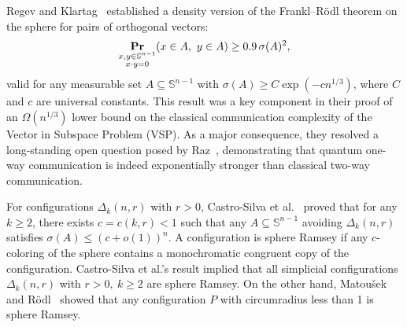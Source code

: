 \documentclass[11pt]{article}
\renewcommand{\Pr}{\mathop{\bf Pr\/}}
\newcommand{\sn}{{\mathbb{S}^{n-1} }}
\begin{document}
\smallskip
Regev and Klartag~\cite{regev2011quantum} established a density version of the Frankl–Rödl theorem on the sphere for pairs of orthogonal vectors:
$$
\Pr_{\substack{x, y \in \sn \\ x \cdot y = 0}}(x \in A,\ y \in A) \geq 0.9\,\sigma(A)^2,
$$
valid for any measurable set $A \subseteq \sn$ with $\sigma(A) \geq C\exp(-cn^{1/3})$, where $C$ and $c$ are universal constants. This result was a key component in their proof of an $\Omega(n^{1/3})$ lower bound on the classical communication complexity of the Vector in Subspace Problem (VSP). As a major consequence, they resolved a long-standing open question posed by Raz~\cite{raz1999exponential}, demonstrating that quantum one-way communication is indeed exponentially stronger than classical two-way communication.

\smallskip
For configurations \( \Delta_k(n, r) \) with \( r > 0 \), Castro-Silva et al.~\cite{castro2022recursive} proved that for any \( k \geq 2 \), there exists \( c = c(k, r) < 1 \) such that any \( A \subseteq \mathbb{S}^{n-1} \) avoiding \( \Delta_k(n, r) \) satisfies \( \sigma(A) \leq (c + o(1))^n \). A configuration is sphere Ramsey if any $c$-coloring of the sphere contains a monochromatic congruent copy of the configuration. Castro-Silva et al.'s result implied that all simplicial configurations \( \Delta_k(n, r) \) with $r>0,\ k\geq 2$ are sphere Ramsey. On the other hand, Matoušek and R\"{o}dl~\cite{matouvsek1995ramsey} showed that any configuration \( P \) with circumradius less than 1 is sphere Ramsey. 
\end{document}
